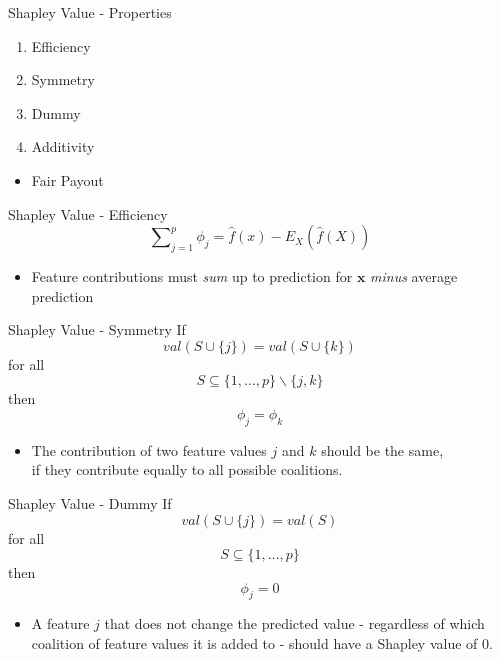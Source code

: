 \begin{frame}{Shapley Value - Properties}
	\begin{enumerate}
		\item Efficiency
		\item Symmetry
		\item Dummy
		\item Additivity
	\end{enumerate}
	\begin{itemize}
		\item Fair Payout
	\end{itemize}
\end{frame}
\begin{frame}{Shapley Value - Efficiency}
	\begin{equation}
		\sum\nolimits_{j=1}^p\phi_j=\hat{f}(x)-E_X(\hat{f}(X))
	\end{equation}
	\begin{itemize}
		\item Feature contributions must \emph{sum} up to prediction for $\bm{x}$ \emph{minus} average prediction
	\end{itemize}
\end{frame}
\begin{frame}{Shapley Value - Symmetry}
	If
	\begin{equation}
		val(S \cup \{j\})=val(S\cup\{k\})
	\end{equation}
	for all
	\begin{equation*}
		S\subseteq\{1,\ldots, p\} \backslash \{j,k\}
	\end{equation*}
	then
	\begin{equation*}
		\phi_j=\phi_k
	\end{equation*}
	\begin{itemize}
		\item The contribution of two feature values $j$ and $k$ should be the same, 
		\\if they contribute equally to all possible coalitions.
	\end{itemize}
\end{frame}
\begin{frame}{Shapley Value - Dummy}
	If
	\begin{equation}
		val(S\cup\{j\})=val(S)
	\end{equation}
	for all
	\begin{equation*}
		S\subseteq\{1,\ldots,p\}
	\end{equation*}
	then
	\begin{equation*}
		\phi_j=0
	\end{equation*}
	\begin{itemize}
		\item A feature $j$ that does not change the predicted value - regardless of which coalition of feature values it is added to - should have a Shapley value of 0.
	\end{itemize}
\end{frame}
